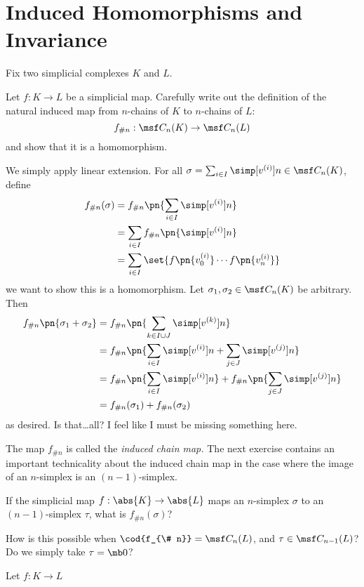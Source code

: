 \section{Induced Homomorphisms and Invariance}
Fix two simplicial complexes $K$ and $L$.
\begin{problem}[16.14]
  Let $f : K \to L$ be a simplicial map. Carefully write out the definition of
  the natural induced map from $n$-chains of $K$ to $n$-chains of $L$:
  \[
    f_{\# n} : \msf C_n(K) \to \msf C_n(L)
  \]
  and show that it is a homomorphism.
\end{problem}
\begin{solution}
  We simply apply linear extension. For all $\sigma = \sum_{i \in I}
  \simp[v^{(i)}]{n} \in \msf C_n(K)$, define
  \begin{align*}
    f_{\# n}(\sigma)
    &= f_{\# n} \pn{\sum_{i\in I} \simp[v^{(i)}]{n} } \\
    &= \sum_{i \in I} f_{\# n}\pn{\simp[v^{(i)}]{n}} \\
    &= \sum_{i \in I} \set{f\pn{v_0^{(i)}}\cdots f\pn{v_n^{(i)}}}
  \end{align*}
  we want to show this is a homomorphism. Let $\sigma_1, \sigma_2 \in \msf
  C_n(K)$ be arbitrary. Then
  \begin{align*}
    f_{\# n}\pn{\sigma_1 + \sigma_2}
    &= f_{\# n} \pn{\sum_{k\in I \cup J} \simp[v^{(k)}]{n}} \\
    &= f_{\# n} \pn{\sum_{i\in I} \simp[v^{(i)}]{n} + \sum_{j \in J} \simp[v^{(j)}]{n}} \\
    &= f_{\# n} \pn{\sum_{i\in I} \simp[v^{(i)}]{n}} + f_{\# n}\pn{\sum_{j \in J} \simp[v^{(j)}]{n}} \\
    &= f_{\# n}(\sigma_1) + f_{\# n}(\sigma_2)
  \end{align*}
  as desired. Is that\ldots all? I feel like I must be missing something here.
\end{solution}
The map $f_{\# n}$ is called the \emph{induced chain map.} The next exercise
contains an important technicality about the induced chain map in the case where
the image of an $n$-simplex is an $(n-1)$-simplex.
\begin{problem}[16.15]
  If the simplicial map $f : \abs{K} \to \abs{L}$ maps an $n$-simplex $\sigma$
  to an $(n-1)$-simplex $\tau$, what is $f_{\# n}(\sigma)$?
\end{problem}
\begin{solution}
  How is this possible when $\cod{f_{\# n}} = \msf C_n(L)$, and $\tau \in \msf
  C_{n-1}(L)$? Do we simply take $\tau = \mb 0$?
\end{solution}
\begin{problem}[16.16]
  Let $f : K \to L$
\end{problem}

